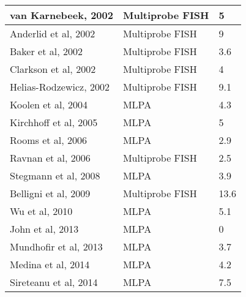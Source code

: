 \begin{table}[]
\begin{tabular}{ | l | l | l | }
	van Karnebeek, 2002    & Multiprobe FISH                & 5                  \\ \hline
	Anderlid et al, 2002   & Multiprobe FISH                & 9                  \\ \hline
	Baker et al, 2002      & Multiprobe FISH                & 3.6                \\ \hline
	Clarkson et al, 2002   & Multiprobe FISH                & 4                  \\ \hline
	Helias-Rodzewicz, 2002 & Multiprobe FISH                & 9.1                \\ \hline
	Koolen et al, 2004     & MLPA                           & 4.3                \\ \hline
	Kirchhoff et al, 2005  & MLPA                           & 5                  \\ \hline
	Rooms et al, 2006      & MLPA                           & 2.9                \\ \hline
	Ravnan et al, 2006     & Multiprobe FISH                & 2.5                \\ \hline
	Stegmann et al, 2008   & MLPA                           & 3.9                \\ \hline
	Belligni et al, 2009   & Multiprobe FISH                & 13.6               \\ \hline
	Wu et al, 2010         & MLPA                           & 5.1                \\ \hline
	John et al, 2013       & MLPA                           & 0                  \\ \hline
	Mundhofir et al, 2013  & MLPA                           & 3.7                \\ \hline
	Medina et al, 2014     & MLPA                           & 4.2                \\ \hline
	Sireteanu et al, 2014  & MLPA                           & 7.5                \\ \hline
\end{tabular}

\end{table}